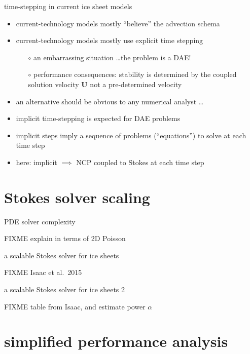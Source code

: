\documentclass[svgnames,
               hyperref={colorlinks,citecolor=DeepPink4,linkcolor=FireBrick,urlcolor=Maroon},
               usepdftitle=false]  %
               {beamer}
\newcommand{\bU}{\mathbf{U}}
\begin{document}
\begin{frame}{time-stepping in current ice sheet models}

\begin{itemize}
\item current-technology models mostly ``believe'' the advection schema
\item current-technology models mostly use explicit time stepping
    \begin{itemize}
    \item[$\circ$] an embarrassing situation \dots the problem is a DAE!
    \item[$\circ$] performance consequences: stability is determined by the coupled solution velocity $\bU$ not a pre-determined velocity
    \end{itemize}

\medskip
\item<2> an alternative should be obvious to any numerical analyst \dots
\item<2> \alert{implicit time-stepping} is expected for DAE problems
\item<2> implicit steps imply a sequence of problems (``equations'') to solve at each time step
\item<2> here: implicit $\implies$ NCP coupled to Stokes at each time step
\end{itemize}
\end{frame}


\section{Stokes solver scaling}

\begin{frame}{PDE solver complexity}

FIXME explain in terms of 2D Poisson
\end{frame}

\begin{frame}{a scalable Stokes solver for ice sheets}

FIXME Isaac et al.~2015
\end{frame}

\begin{frame}{a scalable Stokes solver for ice sheets 2}

FIXME table from Isaac, and estimate power $\alpha$
\end{frame}


\section{simplified performance analysis}
\end{document}
